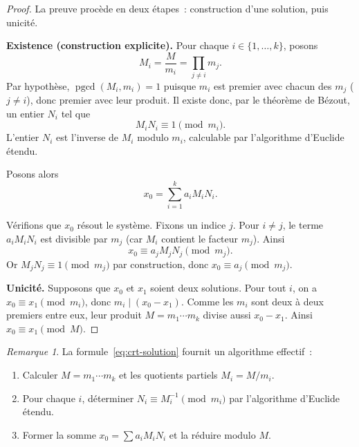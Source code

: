 \documentclass[12pt,a4paper,openany]{book}
\theoremstyle{definition}
\theoremstyle{plain}
\theoremstyle{remark}
\newtheorem{remarque}[definition]{Remarque}
\DeclareMathOperator{\pgcd}{pgcd}
\begin{document}
\begin{proof}
La preuve procède en deux étapes~: construction d'une solution, puis unicité.

\medskip
\noindent\textbf{Existence (construction explicite).}
Pour chaque $i \in \{1, \ldots, k\}$, posons
\[
  M_i = \frac{M}{m_i} = \prod_{j \neq i} m_j.
\]
Par hypothèse, $\pgcd(M_i, m_i) = 1$ puisque $m_i$ est premier avec chacun
des $m_j$ ($j \neq i$), donc premier avec leur produit. Il existe donc,
par le théorème de Bézout, un entier $N_i$ tel que
\[
  M_i N_i \equiv 1 \pmod{m_i}.
\]
L'entier $N_i$ est l'inverse de $M_i$ modulo $m_i$, calculable par
l'algorithme d'Euclide étendu.

Posons alors
\begin{equation}
\label{eq:crt-solution}
  x_0 = \sum_{i=1}^{k} a_i M_i N_i.
\end{equation}

Vérifions que $x_0$ résout le système. Fixons un indice $j$. Pour $i \neq j$,
le terme $a_i M_i N_i$ est divisible par $m_j$ (car $M_i$ contient le facteur
$m_j$). Ainsi
\[
  x_0 \equiv a_j M_j N_j \pmod{m_j}.
\]
Or $M_j N_j \equiv 1 \pmod{m_j}$ par construction, donc
$x_0 \equiv a_j \pmod{m_j}$.

\medskip
\noindent\textbf{Unicité.}
Supposons que $x_0$ et $x_1$ soient deux solutions. Pour tout $i$, on a
$x_0 \equiv x_1 \pmod{m_i}$, donc $m_i \mid (x_0 - x_1)$.
Comme les $m_i$ sont deux à deux premiers entre eux, leur produit
$M = m_1 \cdots m_k$ divise aussi $x_0 - x_1$. Ainsi $x_0 \equiv x_1 \pmod{M}$.
\end{proof}

\begin{remarque}
\label{rem:crt-construction}
La formule~\eqref{eq:crt-solution} fournit un algorithme effectif~:
\begin{enumerate}[label=(\roman*)]
  \item Calculer $M = m_1 \cdots m_k$ et les quotients partiels $M_i = M / m_i$.
  \item Pour chaque $i$, déterminer $N_i \equiv M_i^{-1} \pmod{m_i}$ par
        l'algorithme d'Euclide étendu.
  \item Former la somme $x_0 = \sum a_i M_i N_i$ et la réduire modulo $M$.
\end{enumerate}
\end{remarque}

\end{document}

